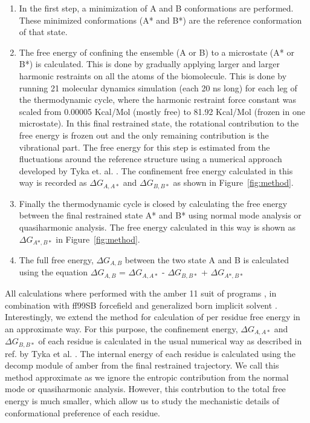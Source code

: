 \documentclass[12pt]{article}
\begin{document}
\begin{enumerate}

\item  In the first step, a minimization of A and B conformations are performed. These minimized conformations (A* and B*)
       are the reference conformation of that state.

\item  The free energy of confining the ensemble (A or B) to a microstate (A* or B*) is
       calculated. This is done by gradually applying larger and larger
       harmonic restraints on all the atoms of the biomolecule. This is done by running 21 molecular dynamics simulation
       (each 20 ns long) for each leg of the thermodynamic cycle, where the harmonic restraint force constant was scaled from 0.00005
       Kcal/Mol (mostly free) to 81.92 Kcal/Mol (frozen in one microstate). In this final restrained state, the
       rotational contribution to the free energy is frozen out
       and the only remaining contribution is the vibrational part. The free energy for this step is
       estimated from the fluctuations around
       the reference structure using a numerical
       approach developed by Tyka et. al. \cite{Tyka2006}. The confinement free energy calculated in
       this way is recorded as
       $\Delta G_{A,A*}$ and $\Delta G_{B,B*}$ as shown in Figure~\ref{fig:method}.

\item  Finally the thermodynamic cycle is closed by calculating the free energy between the final
       restrained state A* and B* using normal mode analysis or quasiharmonic analysis. The free energy calculated in
       this way is shown as $\Delta G_{A*,B*}$ in Figure~\ref{fig:method}.

\item  The full free energy, $\Delta G_{A,B}$ between the two state A and B is calculated using the equation
       $\Delta G_{A,B}$ = $\Delta G_{A,A*}$ - $\Delta G_{B,B*}$ + $\Delta G_{A*,B*}$

\end{enumerate}

All calculations where performed with the amber 11 suit of programs \cite{Case2012},\cite{Goetz2012} in
combination with ff99SB forcefield\cite{Hornak2006} and generalized born implicit solvent \cite{Mongan2006}.
Interestingly, we extend the method for calculation of per residue free
energy in an approximate way. For this purpose, the confinement energy, $\Delta G_{A,A*}$ and
$\Delta G_{B,B*}$ of each residue is calculated in the usual numerical way as described in ref. by Tyka 
et al. \cite{Tyka2006}. The internal energy of each residue is calculated using the decomp module of amber from the final
restrained trajectory. We call this method approximate as we ignore the entropic contribution from the normal
mode or quasiharmonic analysis. However, this contrbution to the total free energy is much smaller,
which allow us to study the mechanistic details of conformational preference of each residue.
      
\end{document}

